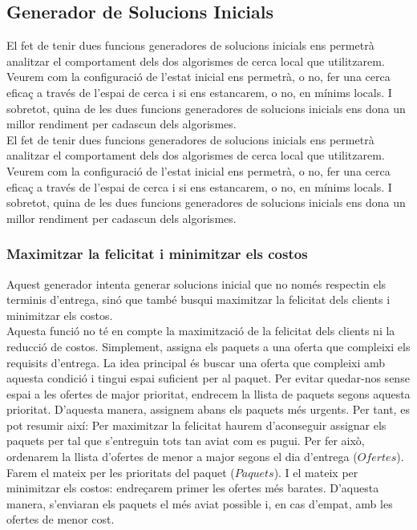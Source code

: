 \documentclass[a4paper]{article}
\begin{document}
	\subsection{Generador de Solucions Inicials}
	
	El fet de tenir dues funcions generadores de solucions inicials ens permetrà analitzar el comportament dels dos algorismes de cerca local que utilitzarem. Veurem com la configuració de l'estat inicial ens permetrà, o no, fer una cerca eficaç a través de l'espai de cerca i si ens estancarem, o no, en mínims locals. I sobretot, quina de les dues funcions generadores de solucions inicials ens dona un millor rendiment per cadascun dels algorismes. \\
	El fet de tenir dues funcions generadores de solucions inicials ens permetrà analitzar el comportament dels dos algorismes de cerca local que utilitzarem. Veurem com la configuració de l'estat inicial ens permetrà, o no, fer una cerca eficaç a través de l'espai de cerca i si ens estancarem, o no, en mínims locals. I sobretot, quina de les dues funcions generadores de solucions inicials ens dona un millor rendiment per cadascun dels algorismes.
	
	\subsubsection{Maximitzar la felicitat i minimitzar els costos}
	\label{sec:GenSolIni_felicitat}
	
	Aquest generador intenta generar solucions inicial que no només respectin els terminis d'entrega, sinó que també busqui maximitzar la felicitat dels clients i minimitzar els costos. \\
	
	Aquesta funció no té en compte la maximització de la felicitat dels clients ni la reducció de costos. Simplement, assigna els paquets a una oferta que compleixi els requisits d'entrega. La idea principal és buscar una oferta que compleixi amb aquesta condició i tingui espai suficient per al paquet. Per evitar quedar-nos sense espai a les ofertes de major prioritat, endrecem la llista de paquets segons aquesta prioritat. D'aquesta manera, assignem abans els paquets més urgents. Per tant, es pot resumir així:
	Per maximitzar la felicitat haurem d'aconseguir assignar els paquets per tal que s'entreguin tots tan aviat com es pugui. Per fer això, ordenarem la llista d'ofertes de menor a major segons el dia d'entrega ($Ofertes$). Farem el mateix per les prioritats del paquet ($Paquets$). I el mateix per minimitzar els costos: endreçarem primer les ofertes més barates. D'aquesta manera, s'enviaran els paquets el més aviat possible i, en cas d'empat, amb les ofertes de menor cost. \\
	
\end{document}
